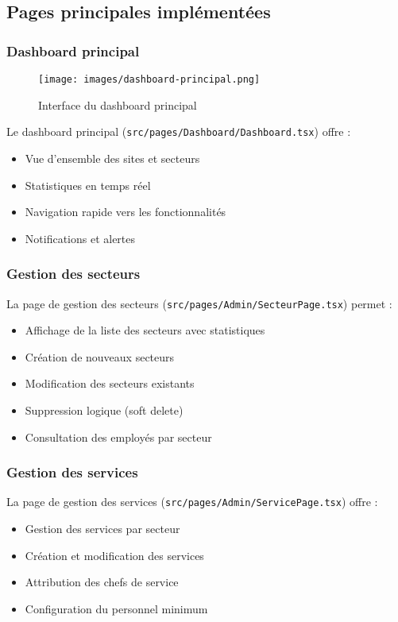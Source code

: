 \subsection{Pages principales implémentées}
\subsubsection{Dashboard principal}
\begin{figure}[h]
\centering
\texttt{[image: images/dashboard-principal.png]}
\caption{Interface du dashboard principal}
\label{fig:dashboard-principal}
\end{figure}

Le dashboard principal (\texttt{src/pages/Dashboard/Dashboard.tsx}) offre :
\begin{itemize}
    \item Vue d'ensemble des sites et secteurs
    \item Statistiques en temps réel
    \item Navigation rapide vers les fonctionnalités
    \item Notifications et alertes
\end{itemize}

\subsubsection{Gestion des secteurs}
La page de gestion des secteurs (\texttt{src/pages/Admin/SecteurPage.tsx}) permet :
\begin{itemize}
    \item Affichage de la liste des secteurs avec statistiques
    \item Création de nouveaux secteurs
    \item Modification des secteurs existants
    \item Suppression logique (soft delete)
    \item Consultation des employés par secteur
\end{itemize}

\subsubsection{Gestion des services}
La page de gestion des services (\texttt{src/pages/Admin/ServicePage.tsx}) offre :
\begin{itemize}
    \item Gestion des services par secteur
    \item Création et modification des services
    \item Attribution des chefs de service
    \item Configuration du personnel minimum
\end{itemize}

